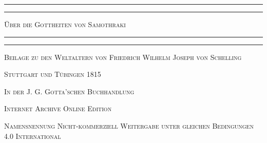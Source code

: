\documentclass[a4paper, 11pt, oneside]{article}
\begin{document}
\renewcommand\thefootnote{\swabfamily{\arabic{footnote}}}
\let\oldfootnote\footnote
    \renewcommand{\footnote}[1]{\oldfootnote{\swabfamily\large#1}}
\begin{titlepage} %
	\centering %

	
	\rule{\textwidth}{1.6pt}\vspace*{-\baselineskip}\vspace*{2pt} %
	\rule{\textwidth}{0.4pt} %
	
	\vspace{1\baselineskip} %
	
	{\scshape\Huge Über die Gottheiten von Samothraki}
	
	\vspace{1\baselineskip} %

	\rule{\textwidth}{0.4pt}\vspace*{-\baselineskip}\vspace{3.2pt} %
	\rule{\textwidth}{1.6pt} %
	
	\vspace{1\baselineskip} %
	
	
	{\scshape \Large Beilage zu den Weltaltern von Friedrich Wilhelm Joseph von Schelling} %
	
	\vspace*{1\baselineskip} %
	    
        \vspace*{\fill}

	\vspace{1\baselineskip}

	{\small\scshape Stuttgart und Tübingen 1815}
	
	{\small\scshape{In der J. G. Gotta'schen Buchhandlung}}
	
	\vspace{0.5\baselineskip} %

        \scshape Internet Archive Online Edition  %
	
	{\scshape\small Namensnennung Nicht-kommerziell Weitergabe unter gleichen Bedingungen 4.0 International} %
\end{titlepage}
\setlength{\parskip}{1mm plus1mm minus1mm}
\clearpage
\tableofcontents
\clearpage
\pagestyle{fancy}
\fancyhf{}
\cfoot{\swabfamily{\thepage}}
\Large
\end{document}
